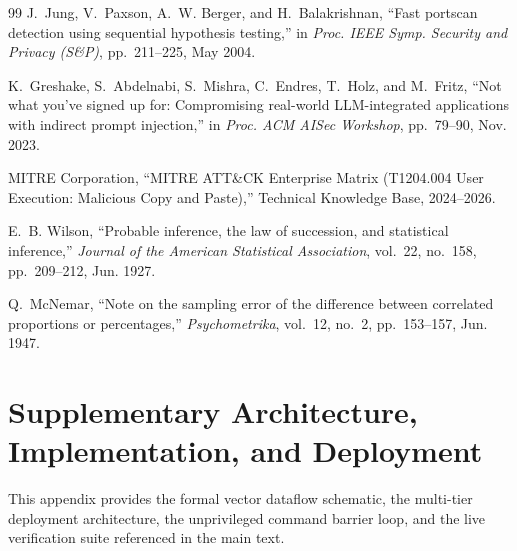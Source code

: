 \documentclass[10pt,twocolumn,letterpaper]{article}
\makeatletter
\theoremstyle{plain}
\theoremstyle{definition}
\theoremstyle{remark}
\DeclareRobustCommand{\_}{\ifmmode\nfss@text{\textunderscore}\else\textunderscore\penalty\@highpenalty\hskip\z@skip\fi}
\makeatother
\begin{document}
\begin{thebibliography}{99}
J.~Jung, V.~Paxson, A.~W. Berger, and H.~Balakrishnan, ``Fast portscan detection using sequential hypothesis testing,'' in \emph{Proc. IEEE Symp. Security and Privacy (S\&P)}, pp.~211--225, May 2004.

K.~Greshake, S.~Abdelnabi, S.~Mishra, C.~Endres, T.~Holz, and M.~Fritz, ``Not what you've signed up for: Compromising real-world LLM-integrated applications with indirect prompt injection,'' in \emph{Proc. ACM AISec Workshop}, pp.~79--90, Nov. 2023.

MITRE Corporation, ``MITRE ATT\&CK Enterprise Matrix (T1204.004 User Execution: Malicious Copy and Paste),'' Technical Knowledge Base, 2024--2026.

E.~B. Wilson, ``Probable inference, the law of succession, and statistical inference,'' \emph{Journal of the American Statistical Association}, vol.~22, no.~158, pp.~209--212, Jun. 1927.

Q.~McNemar, ``Note on the sampling error of the difference between correlated proportions or percentages,'' \emph{Psychometrika}, vol.~12, no.~2, pp.~153--157, Jun. 1947.

\end{thebibliography}

\clearpage
\clearpage
\appendix

\section{Supplementary Architecture, Implementation, and Deployment}
\label{app:supplementary}

This appendix provides the formal vector dataflow schematic, the multi-tier deployment architecture, the unprivileged command barrier loop, and the live verification suite referenced in the main text.
\end{document}

